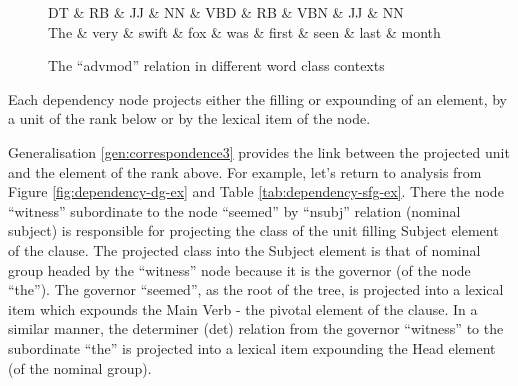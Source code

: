     \begin{figure}[!ht]
        \centering
        \begin{dependency}
            \begin{deptext}[column sep = 1ex, row sep=.1ex]
                DT \& RB \& JJ \& NN \& VBD \& RB \& VBN \& JJ \& NN \\
                The \& very \& swift \& fox \& was \& first \& seen \& last \& month \\ 
            \end{deptext}
        \end{dependency}
        \caption{The ``advmod'' relation in different word class contexts} %
        \label{fig:dependency-advmod}
    \end{figure}
    

    \begin{generalization}\label{gen:correspondence3}
        Each dependency node projects either the filling or expounding of an element, by a unit of the rank below or by the lexical item of the node. 
    \end{generalization}

    Generalisation \ref{gen:correspondence3} provides the link between the projected unit and the element of the rank above. For example, let's return to analysis from Figure \ref{fig:dependency-dg-ex} and Table \ref{tab:dependency-sfg-ex}. There the node ``witness'' subordinate to the node ``seemed'' by ``nsubj'' relation (nominal subject) is responsible for projecting the class of the unit filling  Subject element of the clause. The projected class into the Subject element is that of nominal group headed by the ``witness'' node because it is the governor (of the node ``the''). The governor ``seemed'', as the root of the tree, is projected into a lexical item which expounds the Main Verb - the pivotal element of the clause. In a similar manner, the determiner (det) relation from the governor ``witness'' to the subordinate ``the'' is projected into a lexical item expounding the Head element (of the nominal group).

